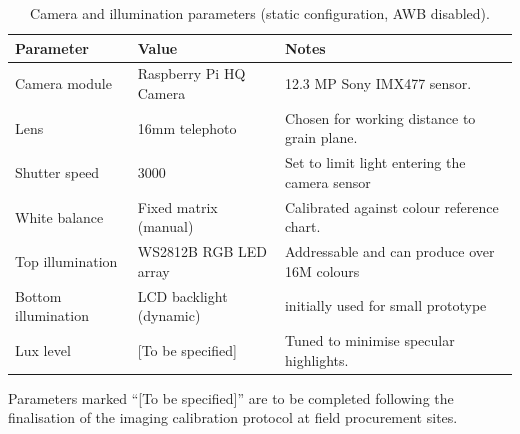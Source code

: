 \vspace{1em}

\begin{table}[h!]
\centering
\caption{Camera and illumination parameters (static configuration, AWB disabled).}
\label{tab:camera_params}
\begin{tabular}{p{4.5cm} p{4cm} p{5cm}}
\toprule
\textbf{Parameter} & \textbf{Value} & \textbf{Notes} \\
\midrule
Camera module        & Raspberry Pi HQ Camera  & 12.3 MP Sony IMX477 sensor. \\
Lens                 & 16mm telephoto           & Chosen for working distance to grain plane. \\
Shutter speed        & 3000        & Set to limit light entering the camera sensor \\
White balance        & Fixed matrix (manual)    & Calibrated against colour reference chart. \\
Top illumination     & WS2812B RGB LED array    & Addressable and can produce over 16M colours \\
Bottom illumination  & LCD backlight (dynamic)  & initially used for small prototype \\
Lux level & [To be specified]        & Tuned to minimise specular highlights. \\
\bottomrule
\end{tabular}
\end{table}

\vspace{1em}
\noindent Parameters marked ``[To be specified]'' are to be completed following the finalisation of the imaging calibration protocol at field procurement sites.
